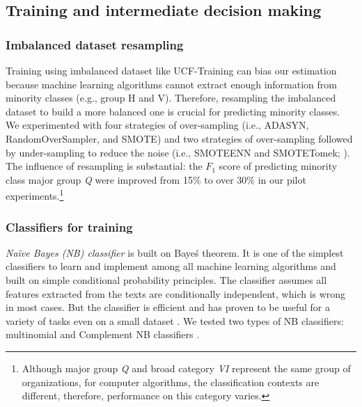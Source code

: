 \documentclass[11pt]{article}
\begin{document}
\subsection{Training and intermediate decision making}

\subsubsection{Imbalanced dataset resampling}

Training using imbalanced dataset like UCF-Training can bias our estimation because machine learning algorithms cannot extract enough information from minority classes (e.g., group H and V). Therefore, resampling the imbalanced dataset to build a more balanced one is crucial for predicting minority classes. We experimented with four strategies of over-sampling (i.e., ADASYN, RandomOverSampler, and SMOTE) and two strategies of over-sampling followed by under-sampling to reduce the noise (i.e., SMOTEENN and SMOTETomek; \cite{LemaitreImbalancedlearnPythonToolbox2017}). The influence of resampling is substantial: the $F_1$ score of predicting minority class major group \textit{Q} were improved from 15\% to over 30\% in our pilot experiments.\footnote{Although major group \textit{Q} and broad category \textit{VI} represent the same group of organizations, for computer algorithms, the classification contexts are different, therefore, performance on this category varies.}

\subsubsection{Classifiers for training}

\textit{Na\"ive Bayes (NB) classifier} is built on Baye\'s theorem. It is one of the simplest classifiers to learn and implement among all machine learning algorithms and built on simple conditional probability principles. The classifier assumes all features extracted from the texts are conditionally independent, which is wrong in most cases. But the classifier is efficient and has proven to be useful for a variety of tasks even on a small dataset \parencites[][76]{JurafskySpeechLanguageProcessing2017}[][277]{GrimmerTextDataPromise2013}. We tested two types of NB classifiers: multinomial and Complement NB classifiers \parencite{RennieTacklingPoorAssumptions2003}.
\end{document}
